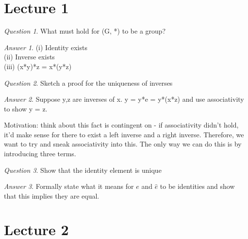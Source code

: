 \documentclass[]{article}
\def\naturals{\mathbb{N}}
\theoremstyle{remark}
\theoremstyle{qnstyle}
\newtheorem{question}{Question}
\theoremstyle{answerstyle}
\newtheorem*{answer}{Answer}
\begin{document}
\noindent


\title{}
\author{}






\section* {Lecture 1}

\begin{question}
    What must hold for (G, *) to be a group?
\end{question}
\begin{answer}
    (i) Identity exists \\
    (ii) Inverse exists\\
    (iii) (x*y)*z = x*(y*z)\\
\end{answer}

\begin{question}
    Sketch a proof for the uniqueness of inverses
\end{question}
\begin{answer}
    Suppose y,z are inverses of x. y = y*e = y*(x*z) and use associativity to show y = z. 

    Motivation: think about this fact is contingent on 
    - if associativity didn't hold, it'd make sense for there to exist 
    a left inverse and a right inverse. Therefore, we want to try and 
    sneak associativity into this. The only way we can do this is by 
    introducing three terms.
\end{answer}

\begin{question}
    Show that the identity element is unique
\end{question}
\begin{answer}
    Formally state what it means for $e$ and $\hat{e}$ to be identities and show that this implies they are equal.
\end{answer}







\section* {Lecture 2}
\end{document}
